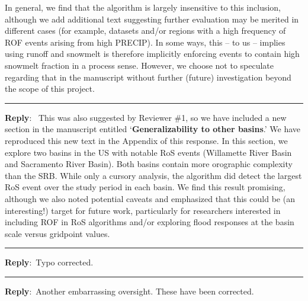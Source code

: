 \documentclass{article}
\newcommand{\genDisc}[1]{\medskip \hrule \vspace{0.25cm}
               {\itshape {\color{violet}{#1}\color{black}} }}
\newcommand{\reply}{\vspace{0.25cm} \textbf{Reply}:\ }
\begin{document}
{In general, we find that the algorithm is largely insensitive to this inclusion, although we add additional text suggesting further evaluation may be merited in different cases (for example, datasets and/or regions with a high frequency of ROF events arising from high PRECIP). In some ways, this -- to us -- implies using runoff and snowmelt is therefore implicitly enforcing events to contain high snowmelt fraction in a process sense. However, we choose not to speculate regarding that in the manuscript without further (future) investigation beyond the scope of this project.
}

\genDisc{It would be helpful to see more written about the transferability of the results to other regions / basins. Particularly, how transferrable would your results be to regions with more elevation complexity as it relates to model treatment of elevation-dependent hydrometeorology, snowpack, and soil antecedent conditions, which would seem relevant to the differences in model grid spacing? If not transferrable, could the authors provide guidance for future research efforts?
}

\reply{
This was also suggested by Reviewer \#1, so we have included a new section in the manuscript entitled {\color{Orange}`\textbf{Generalizability to other basins}.'} We have reproduced this new text in the Appendix of this response. In this section, we explore two basins in the US with notable RoS events (Willamette River Basin and Sacramento River Basin). Both basins contain more orographic complexity than the SRB. While only a cursory analysis, the algorithm did detect the largest RoS event over the study period in each basin. We find this result promising, although we also noted potential caveats and emphasized that this could be (an interesting!) target for future work, particularly for researchers interested in including ROF in RoS algorithms and/or exploring flood responses at the basin scale versus gridpoint values.
}

\genDisc{Line 181: ``(i.e., positive dSWE in both figures denotes snowpack)'', I think ``denotes snow accumulation'' is more accurate.}

\reply{Typo corrected.}

\genDisc{Line 225: This should be ``WY 1996''. In the US, the water year is designated by the calendar year in which it ends. The year ending September 30, 1996 is called the ``1996 WY'', which begins on Oct 1, 1995.}

\reply{Another embarrassing oversight. These have been corrected.}
\end{document}
